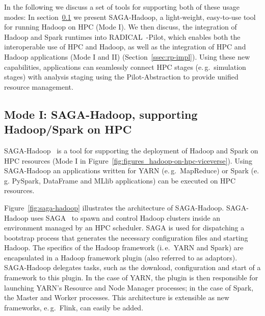 In the following we discuss a set of tools for supporting both of these usage modes:
In section~\ref{ssec:saga_hadoop} we present SAGA-Hadoop, a light-weight, easy-to-use tool for running Hadoop on HPC (Mode I).
We then discuss, the integration of Hadoop and Spark runtimes into RADICAL~-Pilot, which enables both the interoperable use of HPC and Hadoop, as well as the integration of HPC and Hadoop applications (Mode I and II) (Section~\ref{ssec:rp-impl}).
Using these new capabilities, applications can seamlessly connect HPC stages (e.\,g.\ simulation stages) with analysis staging using the Pilot-Abstraction to provide unified resource management.

\subsection{Mode I: SAGA-Hadoop, supporting Hadoop/Spark on HPC}
\label{ssec:saga_hadoop}

SAGA-Hadoop~\cite{saga-hadoop} is a tool for supporting the deployment of Hadoop and Spark on HPC resources (Mode I in Figure~\ref{fig:figures_hadoop-on-hpc-viceverse}).
Using SAGA-Hadoop an applications written for YARN (e.\,g.\ MapReduce) or Spark (e.\,g. PySpark, DataFrame and MLlib applications) can be executed on HPC resources.

Figure~\ref{fig:saga-hadoop} illustrates the architecture of SAGA-Hadoop.
SAGA-Hadoop uses SAGA~\cite{merzky2015saga} to spawn and control Hadoop clusters inside an environment managed by an HPC scheduler.
SAGA is used for dispatching a bootstrap process that generates the necessary configuration files and starting Hadoop.
The specifics of the Hadoop framework (i.\,e.\ YARN and Spark) are encapsulated in a Hadoop framework plugin (also referred to as adaptors).
SAGA-Hadoop delegates tasks, such as the download, configuration and start of a framework to this plugin.
In the case of YARN, the plugin is then responsible for launching YARN's Resource and Node Manager processes; in the case of Spark, the Master and Worker processes.
This architecture is extensible as new frameworks, e.\,g.\ Flink, can easily be added.


